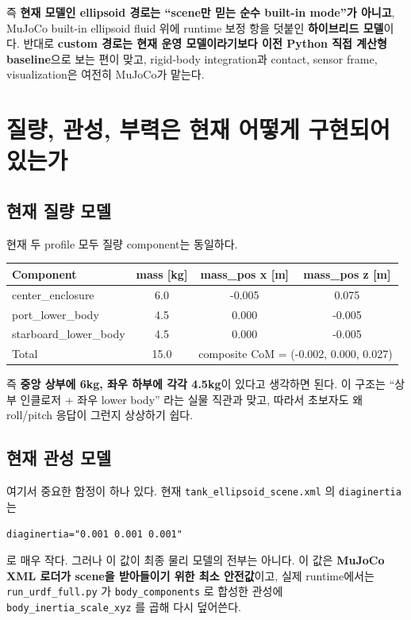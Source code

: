 \documentclass[11pt,a4paper]{article}
\newcommand{\code}[1]{\nolinkurl{#1}}
\begin{document}
즉 \textbf{현재 모델인 ellipsoid 경로는 ``scene만 믿는 순수 built-in mode''가 아니고}, MuJoCo built-in ellipsoid fluid 위에 runtime 보정 항을 덧붙인 \textbf{하이브리드 모델}이다. 반대로 \textbf{custom 경로는 현재 운영 모델이라기보다 이전 Python 직접 계산형 baseline}으로 보는 편이 맞고, rigid-body integration과 contact, sensor frame, visualization은 여전히 MuJoCo가 맡는다.

\section{질량, 관성, 부력은 현재 어떻게 구현되어 있는가}

\subsection{현재 질량 모델}

현재 두 profile 모두 질량 component는 동일하다.

\begin{center}
\small
\begin{tabular}{lccc}
\toprule
Component & mass [kg] & mass\_pos x [m] & mass\_pos z [m] \\
\midrule
center\_enclosure & 6.0 & -0.005 & 0.075 \\
port\_lower\_body & 4.5 & 0.000 & -0.005 \\
starboard\_lower\_body & 4.5 & 0.000 & -0.005 \\
\midrule
Total & 15.0 & \multicolumn{2}{c}{composite CoM = (-0.002, 0.000, 0.027)} \\
\bottomrule
\end{tabular}
\end{center}

즉 \textbf{중앙 상부에 6kg, 좌우 하부에 각각 4.5kg}이 있다고 생각하면 된다. 이 구조는 ``상부 인클로저 + 좌우 lower body'' 라는 실물 직관과 맞고, 따라서 초보자도 왜 roll/pitch 응답이 그런지 상상하기 쉽다.

\subsection{현재 관성 모델}

여기서 중요한 함정이 하나 있다. 현재 \code{tank\_ellipsoid\_scene.xml} 의 \code{diaginertia}는

\begin{verbatim}
diaginertia="0.001 0.001 0.001"
\end{verbatim}

로 매우 작다. 그러나 이 값이 최종 물리 모델의 전부는 아니다. 이 값은 \textbf{MuJoCo XML 로더가 scene을 받아들이기 위한 최소 안전값}이고, 실제 runtime에서는 \code{run\_urdf\_full.py} 가 \code{body\_components} 로 합성한 관성에 \code{body\_inertia\_scale\_xyz} 를 곱해 다시 덮어쓴다.
\end{document}
